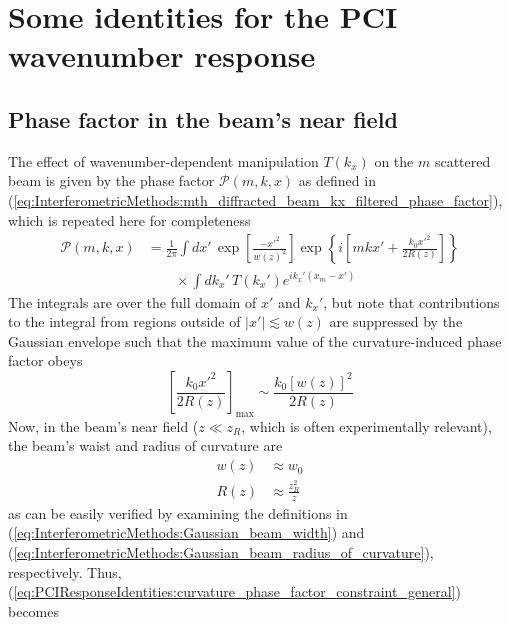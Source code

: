 \chapter{Some identities for the PCI wavenumber response}
\label{app:PCIResponseIdentities}


\section{Phase factor in the beam's near field}
The effect of wavenumber-dependent manipulation $T(k_x)$
on the $m$ scattered beam is given by
the phase factor $\mathcal{P}(m, k, x)$ as defined in
(\ref{eq:InterferometricMethods:mth_diffracted_beam_kx_filtered_phase_factor}),
which is repeated here for completeness
\begin{equation}
  \begin{aligned}
    \mathcal{P}(m, k, x)
    &=
    \frac{1}{2 \pi}
    \int dx' \,
    \exp\left[ \frac{-x'^2}{w(z)^2} \right]
    \exp\left\{%
      i \left[%
        m k x'
        +
        \frac{k_0 x'^2}{2 R(z)}
      \right]
    \right\}
    \\
    &\qquad \times
    \int dk_x' \,
    T(k_x')
    e^{i k_x' (x_m - x')}
  \end{aligned}
  \label{eq:PCIResponseIdentities:mth_diffracted_beam_kx_filtered_phase_factor_full}
\end{equation}
The integrals are over the full domain of $x'$ and $k_x'$, but
note that contributions to the integral
from regions outside of $|x'| \lesssim w(z)$
are suppressed by the Gaussian envelope such that
the maximum value of the curvature-induced phase factor obeys
\begin{equation}
  \left[ \frac{k_0 x'^2}{2 R(z)} \right]_{\text{max}}
  \sim
  \frac{k_0 [w(z)]^2}{2 R(z)}
  \label{eq:PCIResponseIdentities:curvature_phase_factor_constraint_general}
\end{equation}
Now, in the beam's near field
($z \ll z_R$, which is often experimentally relevant),
the beam's waist and radius of curvature are
\begin{align}
  w(z) &\approx w_0
  \\
  R(z) &\approx \frac{z_R^2}{z}
\end{align}
as can be easily verified by examining the definitions in
(\ref{eq:InterferometricMethods:Gaussian_beam_width}) and
(\ref{eq:InterferometricMethods:Gaussian_beam_radius_of_curvature}),
respectively.
Thus,
(\ref{eq:PCIResponseIdentities:curvature_phase_factor_constraint_general})
becomes
